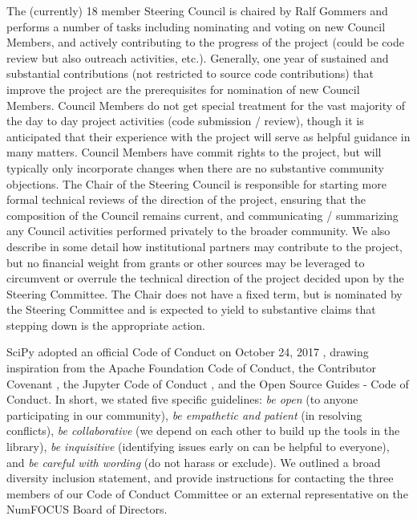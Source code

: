 \documentclass[fleqn,10pt]{wlscirep}
\begin{document}
The (currently) 18 member Steering Council is chaired by Ralf Gommers and
performs a number of tasks including nominating and voting on new Council
Members, and actively contributing to the progress of the project (could be
code review but also outreach activities, etc.). Generally, one year of sustained
and substantial contributions (not restricted to source code contributions)
that improve the project are the prerequisites for nomination of new Council
Members. Council Members do not get special treatment for the vast majority of
the day to day project activities (code submission / review), though it is
anticipated that their experience with the project will serve as helpful
guidance in many matters.  Council Members have commit rights to the project,
but will typically only incorporate changes when there are no substantive
community objections. The Chair of the Steering Council is responsible for
starting more formal technical reviews of the direction of the project,
ensuring that the composition of the Council remains current, and communicating
/ summarizing any Council activities performed privately to the broader
community. We also describe in some detail how institutional partners may
contribute to the project, but no financial weight from grants or other sources
may be leveraged to circumvent or overrule the technical direction of the
project decided upon by the Steering Committee. The Chair does not have a fixed
term, but is nominated by the Steering Committee and is expected to yield to
substantive claims that stepping down is the appropriate action.

SciPy adopted an official Code of Conduct on October 24, 2017
\cite{SciPyCodeOfConduct}, drawing inspiration from the Apache Foundation Code
of Conduct\cite{ApacheCodeOfConduct}, the Contributor Covenant
\cite{ContributorConvenant}, the Jupyter Code of Conduct \cite{Jupyter_COC},
and the Open Source Guides - Code of Conduct\cite{OSG_COC}. In short, we stated
five specific guidelines: \emph{be open} (to anyone participating in our
community), \emph{be empathetic and patient} (in resolving conflicts), \emph{be
collaborative} (we depend on each other to build up the tools in the library),
\emph{be inquisitive} (identifying issues early on can be helpful to everyone),
and \emph{be careful with wording} (do not harass or exclude).  We outlined a
broad diversity inclusion statement, and provide instructions for contacting
the three members of our Code of Conduct Committee or an external
representative on the NumFOCUS Board of Directors.
\end{document}
